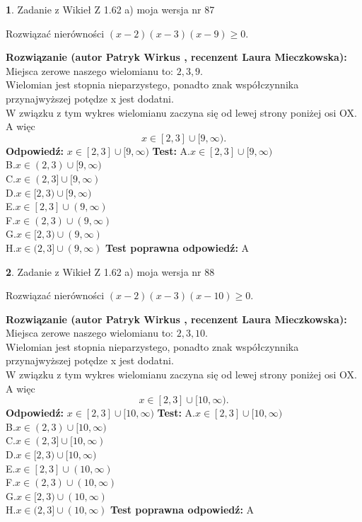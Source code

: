 \documentclass[12pt, a4paper]{article}
\theoremstyle{definition} %
\newtheorem{zad}{}
\newcommand{\zadStart}[1]{\begin{zad}#1\newline}
\newcommand{\zadStop}{\end{zad}}
\newcommand{\rozwStart}[2]{\noindent \textbf{Rozwiązanie (autor #1 , recenzent #2): }\newline}
\newcommand{\rozwStop}{\newline}
\newcommand{\odpStart}{\noindent \textbf{Odpowiedź:}\newline}
\newcommand{\odpStop}{\newline}
\newcommand{\testStart}{\noindent \textbf{Test:}\newline}
\newcommand{\testStop}{\newline}
\newcommand{\kluczStart}{\noindent \textbf{Test poprawna odpowiedź:}\newline}
\newcommand{\kluczStop}{\newline}
\begin{document}
\zadStart{Zadanie z Wikieł Z 1.62 a) moja wersja nr 87}

Rozwiązać nierówności $(x-2)(x-3)(x-9)\ge0$.
\zadStop
\rozwStart{Patryk Wirkus}{Laura Mieczkowska}
Miejsca zerowe naszego wielomianu to: $2, 3, 9$.\\
Wielomian jest stopnia nieparzystego, ponadto znak współczynnika przy\linebreak najwyższej potędze x jest dodatni.\\ W związku z tym wykres wielomianu zaczyna się od lewej strony poniżej osi OX. A więc $$x \in [2,3] \cup [9,\infty).$$
\rozwStop
\odpStart
$x \in [2,3] \cup [9,\infty)$
\odpStop
\testStart
A.$x \in [2,3] \cup [9,\infty)$\\
B.$x \in (2,3) \cup [9,\infty)$\\
C.$x \in (2,3] \cup [9,\infty)$\\
D.$x \in [2,3) \cup [9,\infty)$\\
E.$x \in [2,3] \cup (9,\infty)$\\
F.$x \in (2,3) \cup (9,\infty)$\\
G.$x \in [2,3) \cup (9,\infty)$\\
H.$x \in (2,3] \cup (9,\infty)$
\testStop
\kluczStart
A
\kluczStop



\zadStart{Zadanie z Wikieł Z 1.62 a) moja wersja nr 88}

Rozwiązać nierówności $(x-2)(x-3)(x-10)\ge0$.
\zadStop
\rozwStart{Patryk Wirkus}{Laura Mieczkowska}
Miejsca zerowe naszego wielomianu to: $2, 3, 10$.\\
Wielomian jest stopnia nieparzystego, ponadto znak współczynnika przy\linebreak najwyższej potędze x jest dodatni.\\ W związku z tym wykres wielomianu zaczyna się od lewej strony poniżej osi OX. A więc $$x \in [2,3] \cup [10,\infty).$$
\rozwStop
\odpStart
$x \in [2,3] \cup [10,\infty)$
\odpStop
\testStart
A.$x \in [2,3] \cup [10,\infty)$\\
B.$x \in (2,3) \cup [10,\infty)$\\
C.$x \in (2,3] \cup [10,\infty)$\\
D.$x \in [2,3) \cup [10,\infty)$\\
E.$x \in [2,3] \cup (10,\infty)$\\
F.$x \in (2,3) \cup (10,\infty)$\\
G.$x \in [2,3) \cup (10,\infty)$\\
H.$x \in (2,3] \cup (10,\infty)$
\testStop
\kluczStart
A
\kluczStop
\end{document}
